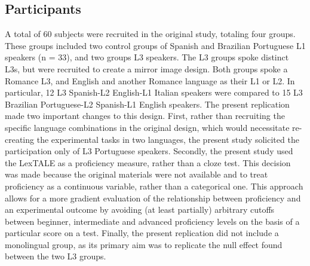 \documentclass[
  man,floatsintext]{apa6}
\begin{document}
\hypertarget{participants}{%
\subsection{Participants}\label{participants}}

A total of 60 subjects were recruited in the original study, totaling four groups.
These groups included two control groups of Spanish and Brazilian Portuguese L1 speakers (n = 33), and two groups L3 speakers.
The L3 groups spoke distinct L3s, but were recruited to create a mirror image design.
Both groups spoke a Romance L3, and English and another Romance language as their L1 or L2.
In particular, 12 L3 Spanish-L2 English-L1 Italian speakers were compared to 15 L3 Brazilian Portuguese-L2 Spanish-L1 English speakers.
The present replication made two important changes to this design.
First, rather than recruiting the specific language combinations in the original design, which would necessitate re-creating the experimental tasks in two languages, the present study solicited the participation only of L3 Portuguese speakers.
Secondly, the present study used the LexTALE as a proficiency measure, rather than a cloze test.
This decision was made because the original materials were not available and to treat proficiency as a continuous variable, rather than a categorical one.
This approach allows for a more gradient evaluation of the relationship between proficiency and an experimental outcome by avoiding (at least partially) arbitrary cutoffs between beginner, intermediate and advanced proficiency levels on the basis of a particular score on a test.
Finally, the present replication did not include a monolingual group, as its primary aim was to replicate the null effect found between the two L3 groups.
\end{document}
